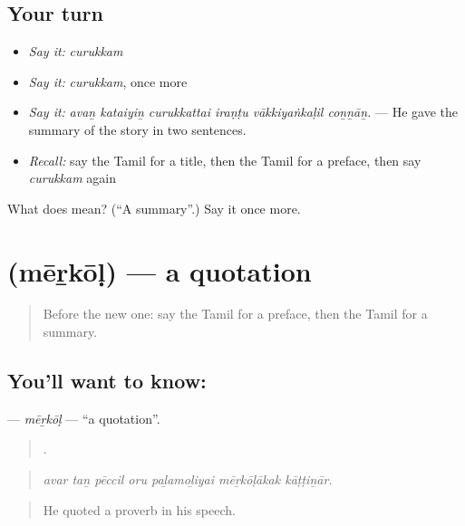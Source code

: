 \subsection*{Your turn}
\begin{itemize}
\raggedright
  \item \emph{Say it:} \emph{curukkam}
  \item \emph{Say it:} \emph{curukkam}, once more
  \item \emph{Say it:} \emph{avaṉ kataiyiṉ curukkattai iraṇṭu vākkiyaṅkaḷil coṉṉāṉ.} — He gave the summary of the story in two sentences.
  \item \emph{Recall:} say the Tamil for a title, then the Tamil for a preface, then say \emph{curukkam} again
\end{itemize}

\begin{tcolorbox}[breakable,colback=teal!4,colframe=teal!35!black,title={Before you move on}]
What does  mean? (\textquotedblleft{}A summary\textquotedblright{}.) Say it once more.
\end{tcolorbox}
\section[\texorpdfstring{\ta{மேற்கோள்} (mēṟkōḷ)}{மேற்கோள் (mēṟkōḷ)}]{ (mēṟkōḷ) — a quotation}

\label{lesson:TA-C365-merkol}



\begin{quote}
Before the new one: say the Tamil for a preface, then the Tamil for a summary.
\end{quote}

\subsection*{You'll want to know: }
\textbf{} — \emph{mēṟkōḷ} — \textquotedblleft{}a quotation\textquotedblright{}.

\begin{quote}
      .
\end{quote}

\begin{quote}
\emph{avar taṉ pēccil oru paḻamoḻiyai mēṟkōḷākak kāṭṭiṉār.}
\end{quote}

\begin{quote}
He quoted a proverb in his speech.
\end{quote}

